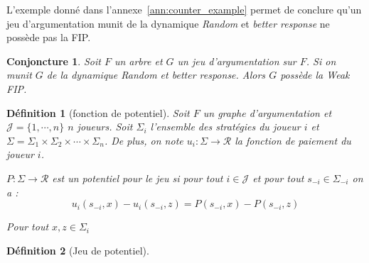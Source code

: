 \documentclass[11pt]{article}
\newtheorem{conjoncture}{Conjoncture}[section]
\theoremstyle{defi}
\newtheorem{definition}{Définition}[section]
\theoremstyle{not}
\theoremstyle{prob}
\begin{document}
      L'exemple donné dans l'annexe~\ref{ann:counter_example} permet de conclure qu'un jeu d'argumentation munit de la dynamique \emph{Random} et \emph{better response} ne possède pas la FIP.

      \begin{conjoncture}
        Soit $F$ un arbre et $G$ un jeu d'argumentation sur $F$. Si on munit $G$ de la dynamique \emph{Random} et \emph{better response}.
        Alors $G$ possède la Weak FIP.
      \end{conjoncture}


      \begin{definition}[fonction de potentiel]
        Soit $F$ un graphe d'argumentation et $\mathcal{J} = \{1, \cdots, n\}$ $n$ joueurs.
        Soit $\Sigma_i$ l'ensemble des stratégies du joueur $i$ et $\Sigma = \Sigma_1 \times \Sigma_2 \times \cdots \times \Sigma_n$.
        De plus, on note $u_i : \Sigma \longrightarrow \mathcal{R}$ la fonction de paiement du joueur $i$.

        $P : \Sigma \longrightarrow \mathcal{R}$ est un potentiel pour le jeu si pour tout $i \in \mathcal{J}$ et pour tout $s_{-i} \in \Sigma_{-i}$ on a :
        $$
          u_i(s_{-i}, x) - u_i(s_{-i}, z) = P(s_{-i}, x) - P(s_{-i}, z)
        $$

        Pour tout $x, z \in \Sigma_i$
      \end{definition}



      \begin{definition}[Jeu de potentiel]

      \end{definition}





    \newpage




  \appendix
\end{document}
